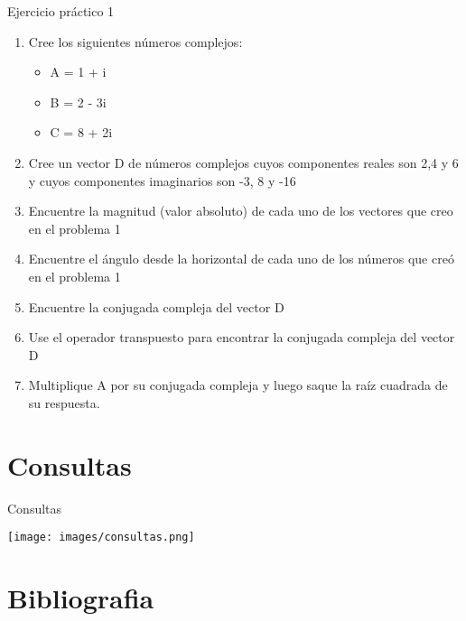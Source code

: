 \documentclass{bredelebeamer}
\begin{document}
\begin{frame}{Ejercicio práctico 1}
\begin{enumerate}
\item Cree los siguientes números complejos:
\begin{itemize}
\item A = 1 + i
\item B = 2 - 3i
\item C = 8 + 2i
\end{itemize}
\item Cree un vector D de números complejos cuyos componentes reales son 2,4 y 6 y cuyos componentes imaginarios son -3, 8 y -16
\item Encuentre la magnitud (valor absoluto) de cada uno de los vectores que creo en el problema 1
\item Encuentre el ángulo desde la horizontal de cada uno de los números que creó en el problema 1
\item Encuentre la conjugada compleja del vector D
\item Use el operador transpuesto para encontrar la conjugada compleja del vector D
\item Multiplique A por su conjugada compleja y luego saque la raíz cuadrada de su respuesta.
\end{enumerate}
\end{frame}




\section{Consultas}
\begin{frame}{Consultas}
\begin{center}
\texttt{[image: images/consultas.png]}
\end{center}
\end{frame}




\section{Bibliografia}
\end{document}
